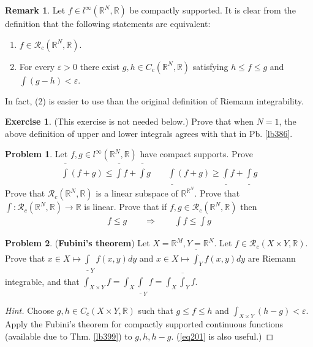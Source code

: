 \documentclass[12pt,b5paper,notitlepage]{article}
\theoremstyle{definition}
\newtheorem{exe}[df]{Exercise}
\newtheorem{rem}[df]{Remark}
\newtheorem{prob}{\color{red}Problem}[section]
\theoremstyle{plain}
\newcommand{\ovl}{\overline}
\newcommand{\udl}{\underline}
\newcommand{\scr}{\mathscr}
\newcommand{\Rbb}{\mathbb R}
\newcommand{\dps}{\displaystyle}
\newcommand{\eps}{\varepsilon}
\numberwithin{equation}{section}
\begin{document}
\begin{rem}\label{lb489}
Let $f\in l^\infty(\Rbb^N,\Rbb)$ be compactly supported. It is clear from the definition that the following statements are equivalent:
\begin{enumerate}[label=(\arabic*)]
\item $f\in\scr R_c(\Rbb^N,\Rbb)$.
\item For every $\eps>0$ there exist $g,h\in C_c(\Rbb^N,\Rbb)$ satisfying $h\leq f\leq g$ and $\int(g-h)<\eps$.
\end{enumerate}
In fact, (2) is easier to use than the original definition of Riemann integrability.
\end{rem}


\begin{exe}
(This exercise is not needed below.) Prove that when $N=1$, the above definition of upper and lower integrals agrees with that in Pb. \ref{lb386}. 
\end{exe}


\begin{prob}
Let $f,g\in l^\infty(\Rbb^N,\Rbb)$ have compact supports. Prove
\begin{align*}
\ovl\int(f+g)\leq\ovl\int f+\ovl\int g\qquad \udl\int(f+g)\geq\udl\int f+\udl\int g
\end{align*}
Prove that $\scr R_c(\Rbb^N,\Rbb)$ is a linear subspace of $\Rbb^{\Rbb^N}$. Prove that  $\int:\scr R_c(\Rbb^N,\Rbb)\rightarrow\Rbb$ is linear. Prove that if $f,g\in\scr R_c(\Rbb^N,\Rbb)$ then
\begin{align}
f\leq g\qquad\Longrightarrow\qquad\int f\leq\int g  \label{eq201}
\end{align}
\end{prob}


\begin{prob}\label{lb493}
(\textbf{Fubini's theorem}) Let $X=\Rbb^M,Y=\Rbb^N$. Let $f\in\scr R_c(X\times Y,\Rbb)$.  Prove that $x\in X\mapsto \udl\int_Y f(x,y)dy $ and $x\in X\mapsto\ovl\int_Y f(x,y)dy$ are Riemann integrable, and that $\dps\int_{X\times Y}f=\int_X\udl\int_Yf=\int_X{\ovl\int_Y}f$.
\end{prob}

\begin{proof}[Hint]
Choose $g,h\in C_c(X\times Y,\Rbb)$ such that $g\leq f\leq h$ and $\int_{X\times Y}(h-g)<\eps$. Apply the Fubini's theorem for compactly supported continuous functions (available due to Thm. \ref{lb399}) to $g,h,h-g$. (\eqref{eq201} is also useful.)
\end{proof}
\end{document}
